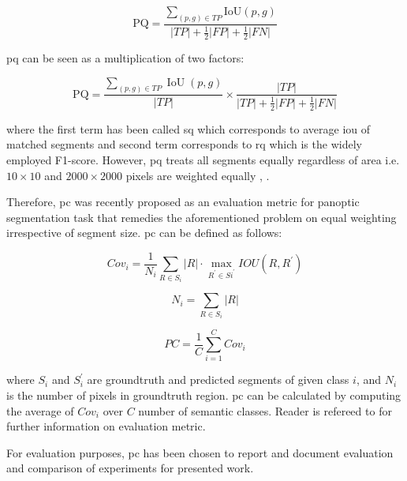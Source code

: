 \begin{equation}\mathrm{PQ}=\frac{\sum_{(p, g) \in T P} \mathrm{IoU}(p, g)}{|T P|+\frac{1}{2}|F P|+\frac{1}{2}|F N|}\end{equation}

\gls{pq} can be seen as a multiplication of two factors:

\begin{equation}\mathrm{PQ}=\frac{\sum_{(p, g) \in T P} \operatorname{IoU}(p, g)}{|T P|} \times \frac{|T P|}{|T P|+\frac{1}{2}|F P|+\frac{1}{2}|F N|}\end{equation}

where the first term has been called \gls{sq} which corresponds to average \gls{iou} of matched segments and second term corresponds to \gls{rq} which is the widely employed F1-score.
However, \gls{pq} treats all segments equally regardless of area i.e.  $10\times10$ and $2000 \times 2000$ pixels are weighted equally \cite{DBLP_panootic_seg:journals/corr/abs-1801-00868}, \cite{DBLPDeeperLab:journals/corr/abs-1902-05093}. 

Therefore, \gls{pc} was recently proposed as an evaluation metric for panoptic segmentation task that remedies the aforementioned problem on equal weighting irrespective of segment size. \gls{pc} can be defined as follows: 

\begin{equation}C o v_{i}=\frac{1}{N_{i}} \sum_{R \in S_{i}}|R| \cdot \max_{R^{\prime} \in S{i}^{\prime}} I O U\left(R, R^{\prime}\right)\end{equation}

\begin{equation}N_{i}=\sum_{R \in S_{i}}|R|\end{equation}

\begin{equation}P C=\frac{1}{C} \sum_{i=1}^{C} C o v_{i}\end{equation}

where $S_{i}$ and $S_{i}^{\prime}$ are groundtruth and predicted segments of given class $i$, and $N_{i}$ is the number of pixels in groundtruth region. \gls{pc} can be calculated by computing the average of $Cov_{i}$ over $C$ number of semantic classes. Reader is refereed to \cite{DBLPDeeperLab:journals/corr/abs-1902-05093} for further information on evaluation metric. 

For evaluation purposes, \gls{pc} has been chosen to report and document evaluation and comparison of experiments for presented work.

